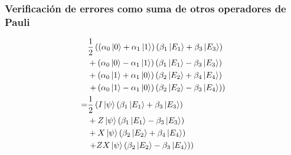\documentclass[english,9pt]{Linnaeus}
\begin{document}
    \begin{frame}
      \frametitle{Verificación de errores como suma de otros operadores de Pauli}
      \begin{align*}
        &\frac{1}{2} \left(\left(\alpha_0 \ket{0} + \alpha_1 \ket{1}\right)\left(\beta_1 \ket{E_1} + \beta_3 \ket{E_3}\right)\right.\\
        & + \left(\alpha_0 \ket{0} - \alpha_1 \ket{1}\right)\left(\beta_1 \ket{E_1} - \beta_3 \ket{E_3}\right)\\
        & + \left(\alpha_0 \ket{1} + \alpha_1 \ket{0}\right)\left(\beta_2 \ket{E_2} + \beta_4 \ket{E_4}\right)\\
        &\left. + \left(\alpha_0 \ket{1} - \alpha_1 \ket{0}\right)\left(\beta_2 \ket{E_2} - \beta_3 \ket{E_4}\right)\right)\\
        =&\frac{1}{2} \left(I\ket{\psi}\left(\beta_1 \ket{E_1} + \beta_3 \ket{E_3}\right)\right.\\
        & + Z\ket{\psi}\left(\beta_1 \ket{E_1} - \beta_3 \ket{E_3}\right)\\
        & + X\ket{\psi}\left(\beta_2 \ket{E_2} + \beta_4 \ket{E_4}\right)\\
        &\left. + ZX\ket{\psi}\left(\beta_2 \ket{E_2} - \beta_3 \ket{E_4}\right)\right)
      \end{align*}
    \end{frame}
\end{document}
